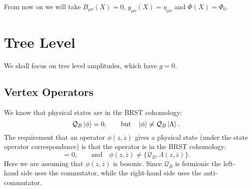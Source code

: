 From now on we will take $B_{\mu\nu}(X) = 0$, $g_{\mu\nu}(X) = \eta_{\mu\nu}$ and $\Phi(X) = \Phi_0$.

\section{Tree Level}%
\label{sec:tree_level}

We shall focus on tree level amplitudes, which have $g = 0$.
\subsection{Vertex Operators}%
\label{sub:vertex_operators}

We know that physical states are in the BRST cohomology:
\begin{equation}
  \mathcal{Q}_B \ket{\phi} = 0, \qquad \text{but} \quad \ket{\phi} \neq \mathcal{Q}_B \ket{\Lambda}.
\end{equation}
The requirement that an operator $\phi(z, \overline{z}{})$ gives a physical state (under the state operator correspondence) is that the operator is in the BRST cohomology:
\begin{equation}
  [\mathcal{Q}_B, \phi(z, \overline{z}{})] = 0, \qquad \text{and} \quad \phi(z, \overline{z}{}) \neq \{\mathcal{Q}_B, \Lambda(z, \overline{z}{})\}.
\end{equation}
Here we are assuming that $\phi(z, \overline{z}{})$ is bosonic. Since $\mathcal{Q}_B$ is fermionic the left-hand side uses the commutator, while the right-hand side uses the anti-commutator.


